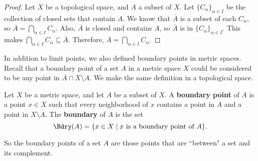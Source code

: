 \begin{proof} Let $X$ be a topological space, and $A$ a subset of $X$. Let $\{C_{\alpha}\}_{\alpha \in I}$ be the collection of closed sets that contain $A$. We know that $\overline{A}$ is a subset of each $C_{\alpha}$, so $\overline{A} = \bigcap_{\alpha \in I} C_{\alpha}$. Also, $\overline{A}$ is closed and contains $A$, so $\overline{A}$ is in $\{C_{\alpha}\}_{\alpha \in I}$. This makes $\bigcap_{\alpha \in I} C_{\alpha} \subseteq \overline{A}$. Therefore, $\overline{A} = \bigcap_{\alpha \in I} C_{\alpha}$. 
\end{proof} 




In addition to limit points, we also defined boundary points in metric spaces. Recall that a boundary point of a set $A$ in a metric space $X$ could be considered to be any point in $\overline{A} \cap \overline{X \setminus A}$. We make the same definition in a topological space. 



\begin{definition} Let $X$ be a metric space, and let $A$ be a subset of $X$. A \textbf{boundary point} of $A$ is a point $x \in X$ such that every neighborhood of $x$ contains a point in $A$ and a point in $X \setminus A$. The \textbf{boundary} of $A$ is the set 
\[\Bdry(A) = \{x \in X \mid x \text{ is a boundary point of } A\}.\]
\end{definition}



So the boundary points of a set $A$ are those points that are ``between" a set and its complement. 




